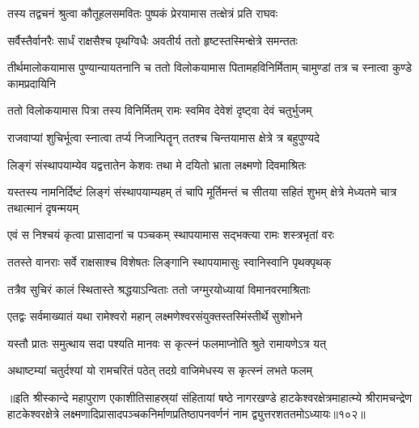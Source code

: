 \twolineshloka
{तस्य तद्वचनं श्रुत्वा कौतूहलसमवितः} 
{पुष्पकं प्रेरयामास तत्क्षेत्रं प्रति राघवः} 

\twolineshloka
{सर्वैस्तैर्वानरैः सार्धं राक्षसैश्च पृथग्विधैः}
{अवतीर्य ततो हृष्टस्तस्मिन्क्षेत्रे समन्ततः}%

\threelineshloka
{तीर्थमालोकयामास पुण्यान्यायतनानि च}
{ततो विलोकयामास पितामहविनिर्मिताम्}
{चामुण्डां तत्र च स्नात्वा कुण्डे कामप्रदायिनि}%

\twolineshloka
{ततो विलोकयामास पित्रा तस्य विनिर्मितम्}
{रामः स्वमिव देवेशं दृष्ट्वा देवं चतुर्भुजम्}%

\twolineshloka
{राजवाप्यां शुचिर्भूत्वा स्नात्वा तर्प्य निजान्पितॄन्}
{ततश्च चिन्तयामास क्षेत्रे त्र बहुपुण्यदे}%

\twolineshloka
{लिङ्गं संस्थापयाम्येव यद्वत्तातेन केशवः}
{तथा मे दयितो भ्राता लक्ष्मणो दिवमाश्रितः}%

\threelineshloka
{यस्तस्य नामनिर्दिष्टं लिङ्गं संस्थापयाम्यहम्}
{तं चापि मूर्तिमन्तं च सीतया सहितं शुभम्}
{क्षेत्रे मेध्यतमे चात्र तथात्मानं दृषन्मयम्}%

\twolineshloka
{एवं स निश्चयं कृत्वा प्रासादानां च पञ्चकम्}
{स्थापयामास सद्भक्त्या रामः शस्त्रभृतां वरः}%

\twolineshloka
{ततस्ते वानराः सर्वे राक्षसाश्च विशेषतः}
{लिङ्गानि स्थापयामासुः स्वानिस्वानि पृथक्पृथक्}%

\twolineshloka
{तत्रैव सुचिरं कालं स्थितास्ते श्रद्धयाऽन्विताः}
{ततो जग्मुरयोध्यायां विमानवरमाश्रिताः}%

\twolineshloka
{एतद्वः सर्वमाख्यातं यथा रामेश्वरो महान्}
{लक्ष्मणेश्वरसंयुक्तस्तस्मिंस्तीर्थे सुशोभने}%

\twolineshloka
{यस्तौ प्रातः समुत्थाय सदा पश्यति मानवः}
{स कृत्स्नं फलमाप्नोति श्रुते रामायणेऽत्र यत्}%

\twolineshloka
{अथाष्टम्यां चतुर्दश्यां यो रामचरितं पठेत्}
{तदग्रे वाजिमेधस्य स कृत्स्नं लभते फलम्}%

॥इति श्रीस्कान्दे महापुराण एकाशीतिसाहस्र्यां संहितायां षष्ठे नागरखण्डे हाटकेश्वरक्षेत्रमाहात्म्ये श्रीरामचन्द्रेण हाटकेश्वरक्षेत्रे लक्ष्मणादिप्रासादपञ्चकनिर्माणप्रतिष्ठापनवर्णनं नाम द्व्युत्तरशततमोऽध्यायः॥१०२॥